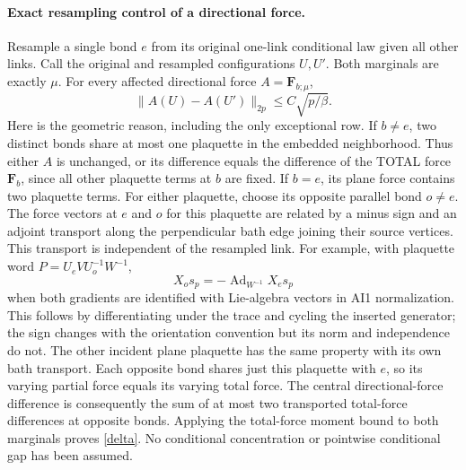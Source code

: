 \documentclass[11pt]{article}
\begin{document}
\paragraph{Exact resampling control of a directional force.}
Resample a single bond $e$ from its original one-link conditional law given all other links.
Call the original and resampled configurations $U,U'$. Both marginals are exactly $\mu$.
For every affected directional force $A=\mathbf F_{b;\mu}$,
\begin{equation}\label{delta}
 \|A(U)-A(U')\|_{2p}\le C\sqrt{p/\beta}.
\end{equation}
Here is the geometric reason, including the only exceptional row.
If $b\ne e$, two distinct bonds share at most one plaquette in the embedded neighborhood.
Thus either $A$ is unchanged, or its difference equals the difference of the TOTAL force
$\mathbf F_b$, since all other plaquette terms at $b$ are fixed.
If $b=e$, its plane force contains two plaquette terms. For either plaquette, choose its
opposite parallel bond $o\ne e$. The force vectors at $e$ and $o$ for this plaquette are
related by a minus sign and an adjoint transport along the perpendicular bath edge joining
their source vertices. This transport is independent of the resampled link.
For example, with plaquette word $P=U_e V U_o^{-1}W^{-1}$,
\[
 X_o s_p=-\operatorname{Ad}_{W^{-1}}X_e s_p
\]
when both gradients are identified with Lie-algebra vectors in AI1 normalization.
This follows by differentiating under the trace and cycling the inserted generator; the
sign changes with the orientation convention but its norm and independence do not.
The other incident plane plaquette has the same property with its own bath transport.
Each opposite bond shares just this plaquette with $e$, so its varying partial force equals
its varying total force. The central directional-force difference is consequently the sum
of at most two transported total-force differences at opposite bonds. Applying the total-force
moment bound to both marginals proves \eqref{delta}. No conditional concentration or
pointwise conditional gap has been assumed.
\end{document}
